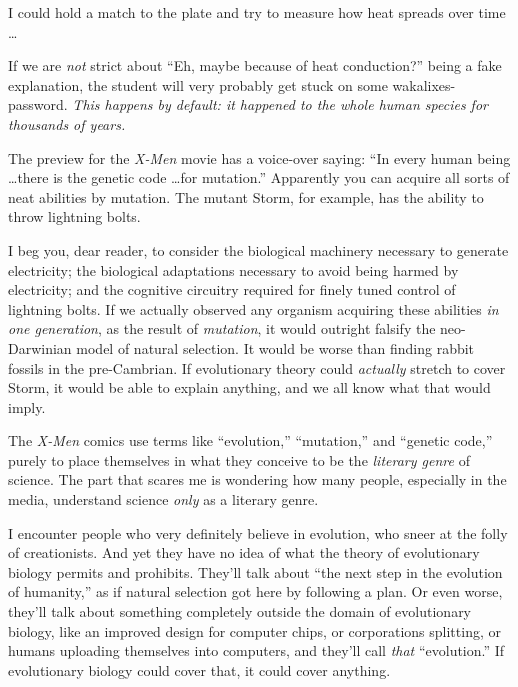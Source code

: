 {
 I could hold a match to the plate and try to measure how heat
spreads over time \ldots}

{
 If we are \textit{not} strict about ``Eh, maybe
because of heat conduction?'' being a fake
explanation, the student will very probably get stuck on some
wakalixes-password. \textit{This happens by default: it happened to the
whole human species for thousands of years.}}

\myendsectiontext


{
 The preview for the \textit{X-Men} movie has a voice-over saying:
``In every human being \ldots there is the genetic code
\ldots for mutation.'' Apparently you can acquire all
sorts of neat abilities by mutation. The mutant Storm, for example, has
the ability to throw lightning bolts.}

{
 I beg you, dear reader, to consider the biological machinery
necessary to generate electricity; the biological adaptations necessary
to avoid being harmed by electricity; and the cognitive circuitry
required for finely tuned control of lightning bolts. If we actually
observed any organism acquiring these abilities \textit{in one
generation}, as the result of \textit{mutation}, it would outright
falsify the neo-Darwinian model of natural selection. It would be worse
than finding rabbit fossils in the pre-Cambrian. If evolutionary theory
could \textit{actually} stretch to cover Storm, it would be able to
explain anything, and we all know what that would imply.}

{
 The \textit{X-Men} comics use terms like
``evolution,''
``mutation,'' and
``genetic code,'' purely to place
themselves in what they conceive to be the \textit{literary genre} of
science. The part that scares me is wondering how many people,
especially in the media, understand science \textit{only} as a literary
genre.}

{
 I encounter people who very definitely believe in evolution, who
sneer at the folly of creationists. And yet they have no idea of what
the theory of evolutionary biology permits and prohibits.
They'll talk about ``the next step in
the evolution of humanity,'' as if natural selection
got here by following a plan. Or even worse, they'll
talk about something completely outside the domain of evolutionary
biology, like an improved design for computer chips, or corporations
splitting, or humans uploading themselves into computers, and
they'll call \textit{that}
``evolution.'' If evolutionary
biology could cover that, it could cover anything.}

